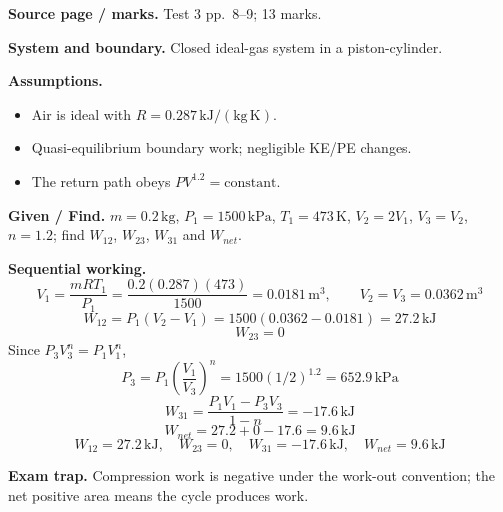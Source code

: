 \textbf{Source page / marks.} Test 3 pp.~8--9; 13 marks.

\textbf{System and boundary.} Closed ideal-gas system in a piston-cylinder.

\textbf{Assumptions.}
\begin{itemize}
  \item Air is ideal with $R=0.287\,\mathrm{kJ/(kg\,K)}$.
  \item Quasi-equilibrium boundary work; negligible KE/PE changes.
  \item The return path obeys $PV^{1.2}=\text{constant}$.
\end{itemize}

\textbf{Given / Find.} $m=0.2\,\mathrm{kg}$, $P_1=1500\,\mathrm{kPa}$, $T_1=473\,\mathrm{K}$, $V_2=2V_1$, $V_3=V_2$, $n=1.2$; find $W_{12}$, $W_{23}$, $W_{31}$ and $W_{net}$.


\textbf{Sequential working.}
\[
V_1=\frac{mRT_1}{P_1}=\frac{0.2(0.287)(473)}{1500}=0.0181\,\mathrm{m^3},\qquad V_2=V_3=0.0362\,\mathrm{m^3}
\]
\[
W_{12}=P_1(V_2-V_1)=1500(0.0362-0.0181)=27.2\,\mathrm{kJ}
\]
\[
W_{23}=0
\]
Since $P_3V_3^n=P_1V_1^n$,
\[
P_3=P_1\left(\frac{V_1}{V_3}\right)^n=1500(1/2)^{1.2}=652.9\,\mathrm{kPa}
\]
\[
W_{31}=\frac{P_1V_1-P_3V_3}{1-n}=-17.6\,\mathrm{kJ}
\]
\[
W_{net}=27.2+0-17.6=9.6\,\mathrm{kJ}
\]
\[
\boxed{W_{12}=27.2\,\mathrm{kJ},\quad W_{23}=0,\quad W_{31}=-17.6\,\mathrm{kJ},\quad W_{net}=9.6\,\mathrm{kJ}}
\]

\textbf{Exam trap.} Compression work is negative under the work-out convention; the net positive area means the cycle produces work.
